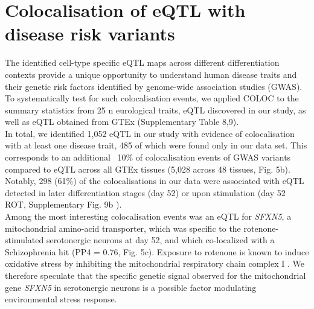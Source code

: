 
\section{Colocalisation of eQTL with disease risk variants}

The identified cell-type specific eQTL maps across different differentiation contexts provide a unique opportunity to understand human disease traits and their genetic risk factors identified by genome-wide association studies (GWAS). 
To systematically test for such colocalisation events, we applied COLOC \cite{giambartolomei2014bayesian} to the summary statistics from 25 n eurological traits, eQTL discovered in our study, as well as eQTL obtained from GTEx (Supplementary Table 8,9).\\

In total, we identified 1,052 eQTL in our study with evidence of colocalisation with at least one disease trait, 485 of which were found only in our data set. 
This corresponds to an additional ~10\% of colocalisation events of GWAS variants compared to eQTL across all GTEx tissues (5,028 across 48 tissues, Fig. 5b). 
Notably, 298 (61\%) of the colocalisations in our data were associated with eQTL detected in later differentiation stages (day 52) or upon stimulation (day 52 ROT, Supplementary Fig. 9b ).\\

Among the most interesting colocalisation events was an eQTL for \textit{SFXN5}, a mitochondrial amino-acid transporter, which was specific to the rotenone-stimulated serotonergic neurons at day 52, and which co-localized with a Schizophrenia hit (PP4 = 0.76, Fig. 5c). 
Exposure to rotenone is known to induce oxidative stress by inhibiting the mitochondrial respiratory chain complex I \cite{palmer1968studies, betarbet2000chronic}. 
We therefore speculate that the specific genetic signal observed for the mitochondrial gene \textit{SFXN5} in serotonergic neurons is a possible factor modulating environmental stress response.\\


